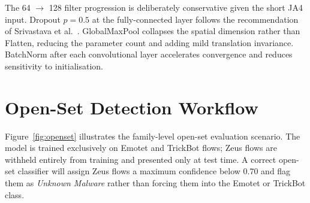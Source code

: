 \documentclass[12pt,a4paper]{report}
\begin{document}
The 64 $\rightarrow$ 128 filter progression is deliberately conservative given
the short JA4 input. Dropout $p = 0.5$ at the fully-connected layer follows
the recommendation of Srivastava et al.~\cite{srivastava2014dropout}.
GlobalMaxPool collapses the spatial dimension rather than Flatten, reducing the
parameter count and adding mild translation invariance. BatchNorm after each
convolutional layer accelerates convergence and reduces sensitivity to
initialisation.

\newpage
\section{Open-Set Detection Workflow}

Figure~\ref{fig:openset} illustrates the family-level open-set evaluation
scenario. The model is trained exclusively on Emotet and TrickBot flows; Zeus
flows are withheld entirely from training and presented only at test time.
A correct open-set classifier will assign Zeus flows a maximum confidence below
0.70 and flag them as \textit{Unknown Malware} rather than forcing them into
the Emotet or TrickBot class.
\end{document}
